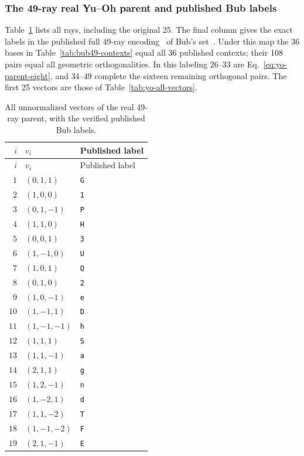 \documentclass[aps,pra,reprint,superscriptaddress,longbibliography,nofootinbib,floatfix,10pt]{revtex4-2}
\theoremstyle{definition}
\begin{document}
\subsubsection{The 49-ray real Yu--Oh parent and published Bub labels}
Table~\ref{tab:bub49-vectors} lists all rays, including the original 25.
The final column gives the exact labels in the published full 49-ray
encoding~\cite[p.~14, Sec.~5(xi)]{Pavicic-2005} of Bub's set~\cite{bub}. Under this map
the 36 bases in Table~\ref{tab:bub49-contexts} equal all 36 published
contexts; their 108 pairs equal all geometric orthogonalities. In this
labeling $26$--$33$ are Eq.~\eqref{eq:yo-parent-eight}, and $34$--$49$
complete the sixteen remaining orthogonal pairs. The first 25 vectors
are those of Table~\ref{tab:yo-all-vectors}.
\begingroup\small
{}
\begin{longtable}{rll}
\caption{All unnormalized vectors of the real 49-ray parent, with the verified published Bub labels.}\label{tab:bub49-vectors}\\
\toprule
$i$ & $v_i$ & Published label\\\midrule
\endfirsthead
\toprule
$i$ & $v_i$ & Published label\\\midrule
\endhead
\bottomrule\endfoot
$1$ & $(0,1,1)$ & \texttt{G}\\
$2$ & $(1,0,0)$ & \texttt{1}\\
$3$ & $(0,1,-1)$ & \texttt{P}\\
$4$ & $(1,1,0)$ & \texttt{H}\\
$5$ & $(0,0,1)$ & \texttt{3}\\
$6$ & $(1,-1,0)$ & \texttt{U}\\
$7$ & $(1,0,1)$ & \texttt{Q}\\
$8$ & $(0,1,0)$ & \texttt{2}\\
$9$ & $(1,0,-1)$ & \texttt{e}\\
$10$ & $(1,-1,1)$ & \texttt{D}\\
$11$ & $(1,-1,-1)$ & \texttt{h}\\
$12$ & $(1,1,1)$ & \texttt{S}\\
$13$ & $(1,1,-1)$ & \texttt{a}\\
$14$ & $(2,1,1)$ & \texttt{g}\\
$15$ & $(1,2,-1)$ & \texttt{n}\\
$16$ & $(1,-2,1)$ & \texttt{d}\\
$17$ & $(1,1,-2)$ & \texttt{T}\\
$18$ & $(1,-1,-2)$ & \texttt{F}\\
$19$ & $(2,1,-1)$ & \texttt{E}\\

\end{longtable}
\end{document}
